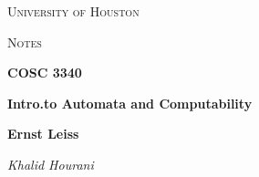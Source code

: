 \documentclass[a4paper]{book}
\theoremstyle{definition}
\begin{document}
\begin{titlepage}
	\centering
	{\scshape\LARGE University of Houston\par}
	\vspace{1cm}
	{\scshape\Large Notes \par}
	\vspace{1.5cm}
	{\huge\bfseries COSC 3340 \par}
	{\huge\bfseries Intro.\@ to Automata and Computability \par}
	\vspace{0.5cm}
	{\large\bfseries Ernst Leiss\par}
	\vspace{1cm}
	{\Large\textit{Khalid Hourani}}
	\vspace{0.5cm}
	{\large \par} %
	\vfill
\end{titlepage}

\tableofcontents
\newpage{}




\end{document}
